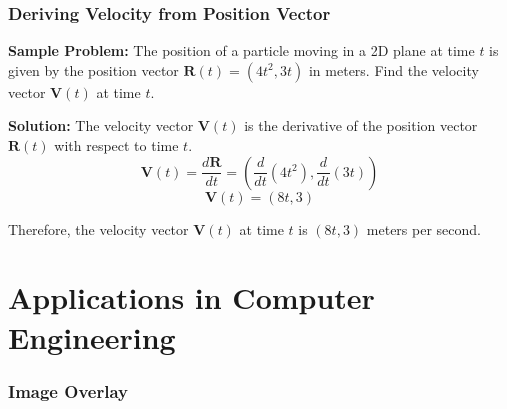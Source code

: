 \documentclass{beamer}
\begin{document}
\begin{frame}
  \frametitle{Deriving Velocity from Position Vector}
  
  \textbf{Sample Problem:}
  The position of a particle moving in a 2D plane at time \( t \) is given by the position vector \( \mathbf{R}(t) = (4t^2, 3t) \) in meters. Find the velocity vector \( \mathbf{V}(t) \) at time \( t \).
  
  \vspace{10pt}
  
  \textbf{Solution:}
  The velocity vector \( \mathbf{V}(t) \) is the derivative of the position vector \( \mathbf{R}(t) \) with respect to time \( t \).
  \[ \mathbf{V}(t) = \frac{d\mathbf{R}}{dt} = \left(\frac{d}{dt}(4t^2), \frac{d}{dt}(3t)\right) \]
  \[ \mathbf{V}(t) = (8t, 3) \]
  
  Therefore, the velocity vector \( \mathbf{V}(t) \) at time \( t \) is \( (8t, 3) \) meters per second.
\end{frame}

\section{Applications in Computer Engineering}


\begin{frame}[plain]
        \frametitle{Image Overlay}
    
\end{frame}
\end{document}
